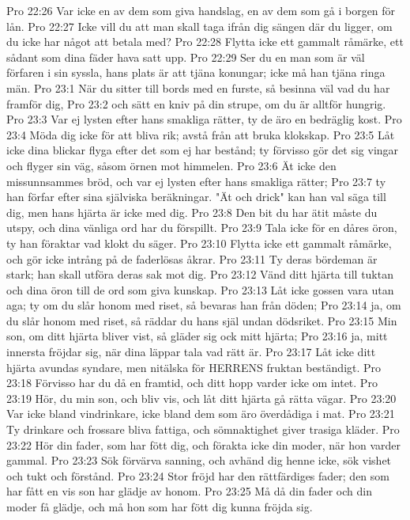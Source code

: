 Pro 22:26  Var icke en av dem som giva handslag, en av dem som gå i borgen för lån.
Pro 22:27  Icke vill du att man skall taga ifrån dig sängen där du ligger, om du icke har något att betala med?
Pro 22:28  Flytta icke ett gammalt råmärke, ett sådant som dina fäder hava satt upp.
Pro 22:29  Ser du en man som är väl förfaren i sin syssla, hans plats är att tjäna konungar; icke må han tjäna ringa män.
Pro 23:1  När du sitter till bords med en furste, så besinna väl vad du har framför dig,
Pro 23:2  och sätt en kniv på din strupe, om du är alltför hungrig.
Pro 23:3  Var ej lysten efter hans smakliga rätter, ty de äro en bedräglig kost.
Pro 23:4  Möda dig icke för att bliva rik; avstå från att bruka klokskap.
Pro 23:5  Låt icke dina blickar flyga efter det som ej har bestånd; ty förvisso gör det sig vingar och flyger sin väg, såsom örnen mot himmelen.
Pro 23:6  Ät icke den missunnsammes bröd, och var ej lysten efter hans smakliga rätter;
Pro 23:7  ty han förfar efter sina själviska beräkningar. "Ät och drick" kan han val säga till dig, men hans hjärta är icke med dig.
Pro 23:8  Den bit du har ätit måste du utspy, och dina vänliga ord har du förspillt.
Pro 23:9  Tala icke för en dåres öron, ty han föraktar vad klokt du säger.
Pro 23:10  Flytta icke ett gammalt råmärke, och gör icke intrång på de faderlösas åkrar.
Pro 23:11  Ty deras bördeman är stark; han skall utföra deras sak mot dig.
Pro 23:12  Vänd ditt hjärta till tuktan och dina öron till de ord som giva kunskap.
Pro 23:13  Låt icke gossen vara utan aga; ty om du slår honom med riset, så bevaras han från döden;
Pro 23:14  ja, om du slår honom med riset, så räddar du hans själ undan dödsriket.
Pro 23:15  Min son, om ditt hjärta bliver vist, så gläder sig ock mitt hjärta;
Pro 23:16  ja, mitt innersta fröjdar sig, när dina läppar tala vad rätt är.
Pro 23:17  Låt icke ditt hjärta avundas syndare, men nitälska för HERRENS fruktan beständigt.
Pro 23:18  Förvisso har du då en framtid, och ditt hopp varder icke om intet.
Pro 23:19  Hör, du min son, och bliv vis, och låt ditt hjärta gå rätta vägar.
Pro 23:20  Var icke bland vindrinkare, icke bland dem som äro överdådiga i mat.
Pro 23:21  Ty drinkare och frossare bliva fattiga, och sömnaktighet giver trasiga kläder.
Pro 23:22  Hör din fader, som har fött dig, och förakta icke din moder, när hon varder gammal.
Pro 23:23  Sök förvärva sanning, och avhänd dig henne icke, sök vishet och tukt och förstånd.
Pro 23:24  Stor fröjd har den rättfärdiges fader; den som har fått en vis son har glädje av honom.
Pro 23:25  Må då din fader och din moder få glädje, och må hon som har fött dig kunna fröjda sig.
